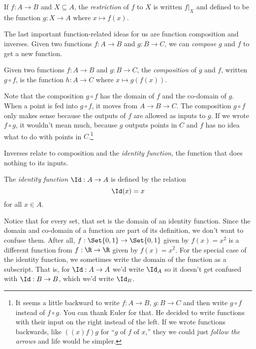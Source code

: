 	\begin{definition}[Restriction]
		If $f:A\to B$ and $X\subseteq A$, the \emph{restriction}
		of $f$ to $X$ is written 
		$f\big|_X$ and defined to be the function $g:X\to A$ where $x\mapsto f(x)$.
	\end{definition}

	The last important function-related ideas for us are function composition and inverses.
	Given two functions $f:A\to B$ and $g:B\to C$, we can \emph{compose}
	$g$ and $f$ to get a new function.
	\begin{definition}[Composition]
		Given two functions $f:A\to B$ and $g:B\to C$, the \emph{composition} of
		$g$ and $f$, written $g\circ f$, is the function $h:A\to C$ where 
		$x\mapsto g(f(x))$.
	\end{definition}
	Note that the composition $g\circ f$ has the domain of $f$ and the co-domain of $g$.
	When a point is fed into $g\circ f$, it moves from $A\to B\to C$.  The composition
	$g\circ f$ only makes sense because the outputs of $f$ are allowed as inputs to $g$.
	If we wrote $f\circ g$, it wouldn't mean much, because $g$ outputs points in $C$ and $f$
	has no idea what to do with points in $C$.\footnote{
		It seems a little backward to write $f:A\to B$, $g:B\to C$ and then
		write $g\circ f$ instead of $f\circ g$.  You can thank Euler for that.
		He decided to write functions with their input on the right instead of
		the left.  If we wrote functions backwards, like $((x)f)g$ for ``$g$ of $f$ of $x$,''
		they we could just \emph{follow the arrows} and life would be simpler.
	}

	Inverses relate to composition and the \emph{identity function}, the function
	that does nothing to its inputs.
	\begin{definition}
		The \emph{identity function} $\Id:A\to A$ is defined by the relation
		\[
			\Id(x)=x
		\]
		for all $x\in A$.
	\end{definition}
	Notice that for every set, that set
	is the domain of an identity function.  Since the domain
	and co-domain of a function are part of its definition, we don't want to confuse them.
	After all, $f:\Set{0,1}\to \Set{0,1}$ given by $f(x)=x^2$ is a different function from $f:\R\to\R$
	given by $f(x)=x^2$.  For the special case of the identity function, we sometimes write
	the domain of the function as a subscript.  That is, 
	for $\Id:A\to A$ we'd write $\Id_A$ so it
	doesn't get confused with $\Id:B\to B$, which we'd write $\Id_B$.

